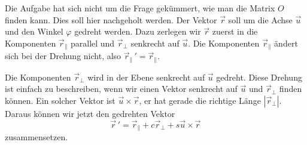 \begin{diskussion}
Die Aufgabe hat sich nicht um die Frage gekümmert, wie man die Matrix $O$
finden kann.
Dies soll hier nachgeholt werden.
Der Vektor $\vec r$ soll um die Achse $\vec u$ und den Winkel $\varphi$
gedreht werden.
Dazu zerlegen wir $\vec r$ zuerst in die Komponenten $\vec r_{\|}$ parallel
und $\vec r_{\perp}$ senkrecht auf $\vec u$.
Die Komponenten $\vec r_{\|}$ ändert sich bei der Drehung nicht, also
$\vec r_{\|}\,\!'=\vec r_{\|}$.

Die Komponenten $\vec r_{\perp}$ wird in der Ebene senkrecht auf
$\vec u$ gedreht.
Diese Drehung ist einfach zu beschreiben, wenn wir einen Vektor senkrecht auf
$\vec u$ und $\vec r_{\perp}$ finden können.
Ein solcher Vektor ist $\vec u\times \vec r$, er hat gerade die richtige 
Länge $|\vec r_{\perp}|$.
Daraus können wir jetzt den gedrehten Vektor 
\[
\vec r\,' = \vec r_{\|} + c \vec r_{\perp} + s \vec u\times \vec r
\]
zusammensetzen.


\end{diskussion}
